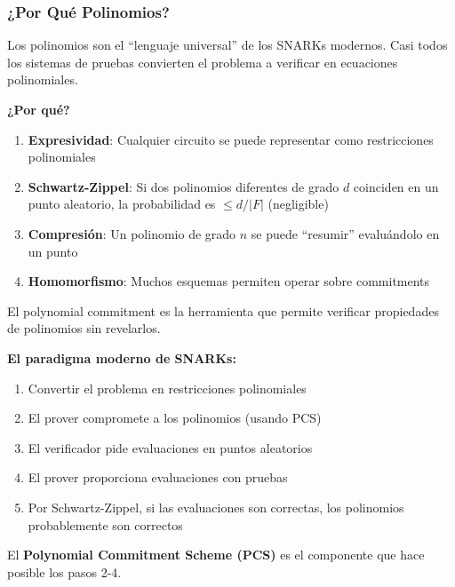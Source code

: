\documentclass[11pt,a4paper,twoside,openright]{book}
\theoremstyle{definition}
\theoremstyle{plain}
\theoremstyle{remark}
\begin{document}
\subsubsection{¿Por Qué Polinomios?}

\begin{intuicion}
Los polinomios son el ``lenguaje universal'' de los SNARKs modernos. Casi todos los sistemas de pruebas convierten el problema a verificar en ecuaciones polinomiales.

\textbf{¿Por qué?}
\begin{enumerate}
    \item \textbf{Expresividad}: Cualquier circuito se puede representar como restricciones polinomiales
    \item \textbf{Schwartz-Zippel}: Si dos polinomios diferentes de grado $d$ coinciden en un punto aleatorio, la probabilidad es $\leq d/|F|$ (negligible)
    \item \textbf{Compresión}: Un polinomio de grado $n$ se puede ``resumir'' evaluándolo en un punto
    \item \textbf{Homomorfismo}: Muchos esquemas permiten operar sobre commitments
\end{enumerate}

El polynomial commitment es la herramienta que permite verificar propiedades de polinomios sin revelarlos.
\end{intuicion}

\begin{keyidea}
\textbf{El paradigma moderno de SNARKs:}

\begin{enumerate}
    \item Convertir el problema en restricciones polinomiales
    \item El prover compromete a los polinomios (usando PCS)
    \item El verificador pide evaluaciones en puntos aleatorios
    \item El prover proporciona evaluaciones con pruebas
    \item Por Schwartz-Zippel, si las evaluaciones son correctas, los polinomios probablemente son correctos
\end{enumerate}

El \textbf{Polynomial Commitment Scheme (PCS)} es el componente que hace posible los pasos 2-4.
\end{keyidea}

\end{document}
